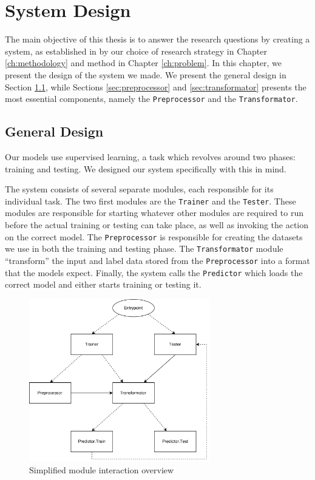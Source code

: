 
\chapter{System Design}
\label{ch:system_design}
The main objective of this thesis is to answer the research questions by creating a system, as established in by our choice of research strategy in Chapter \ref{ch:methodology} and method in Chapter \ref{ch:problem}. In this chapter, we present the design of the system we made. We present the general design in Section \ref{sec:general_design}, while Sections \ref{sec:preprocessor} and \ref{sec:transformator} presents the most essential components, namely the {\tt Preprocessor} and the {\tt Transformator}.


\section{General Design}
\label{sec:general_design}
Our models use supervised learning, a task which revolves around two phases: training and testing. We designed our system specifically with this in mind.

The system consists of several separate modules, each responsible for its individual task. The two first modules are the {\tt Trainer} and the {\tt Tester}. These modules are responsible for starting whatever other modules are required to run before the actual training or testing can take place, as well as invoking the action on the correct model. The {\tt Preprocessor} is responsible for creating the datasets we use in both the training and testing phase. The {\tt Transformator} module ``transform'' the input and label data stored from the {\tt Preprocessor} into a format that the models expect. Finally, the system calls the {\tt Predictor} which loads the correct model and either starts training or testing it.

\begin{figure}[ht]
    \centering
    \includegraphics[width=0.7\textwidth]{fig/system_design/system_design.png}
    \caption{Simplified module interaction overview}
    \label{fig:system-design}
\end{figure}

